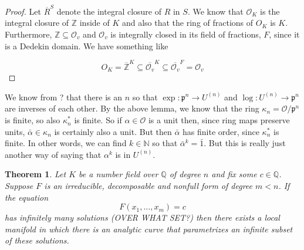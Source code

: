 \documentclass{article}
\newtheorem{theorem}{Theorem}[section]
\newcommand{\mfrak}[1]{\mathfrak{#1}}
\newcommand{\mcal}[1]{\mathcal{#1}}
\newcommand{\mbb}[1]{\mathbb{#1}}
\begin{document}
\begin{proof}
    Let $\overline{R}^S$ denote the integral closure of $R$ in $S$. We know that $\mcal O_K$ is the integral closure of $\mbb Z$ inside of $K$ and also that the ring of fractions of $O_K$ is $K$. Furthermore, $\mbb Z \subseteq \mcal O_v$ and $\mcal O_v$ is integrally closed in its field of fractions, $F$, since it is a Dedekin domain. We have something like 

    $$O_K = \overline {\mbb{Z}}^K \subseteq \overline {\mcal O_v}^K \subseteq \overline {\mcal O_v}^F = \mcal O_v$$ 
    
\end{proof}



We know from ? that there is an $n$ so that $\exp : \mfrak p^n \to U^{(n)}$ and $\log : U^{(n)} \to \mfrak p^n$ are inverses of each other. By the above lemma, we know that the ring $\kappa_n = \mcal{O} / \mfrak p^n$ is finite, so also $\kappa_n^*$ is finite. So if $\alpha \in \mcal O$ is a unit then, since ring maps preserve units, $\bar \alpha \in \kappa_n$ is certainly also a unit. But then $\bar \alpha$ has finite order, since $\kappa_n^*$ is finite. In other words, we can find $k \in \mbb N$ so that $\bar \alpha^k = \bar 1$. But this is really just another way of saying that $\alpha^k$ is in $U^{(n)}$.




\begin{theorem}
    Let $K$ be a number field over $\mbb Q$ of degree $n$ and fix some $c \in \mbb Q$. Suppose $F$ is an irreducible, decomposable and nonfull form of degree $m < n$. If the equation 
    $$F(x_1, ..., x_m) = c$$
    has infinitely many solutions (OVER WHAT SET?) then there exists a local manifold in which there is an analytic curve that parametrizes an infinite subset of these solutions.   
\end{theorem}
\end{document}
